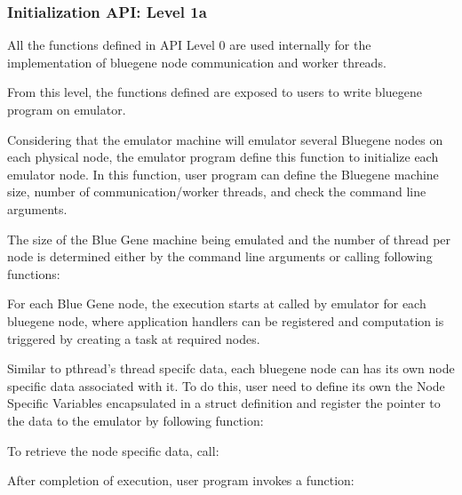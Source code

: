\subsubsection{Initialization API: Level 1a}

All the functions defined in API Level 0 are used internally for the 
implementation of bluegene node communication and worker threads.

From this level, the functions defined are exposed to users to write bluegene
program on emulator.

Considering that the emulator machine will emulator several Bluegene nodes on
each physical node, the emulator program define this function 
 to initialize each emulator
node. In this function, user program can define the Bluegene machine size,
number of communication/worker threads, and check the command line arguments.

The size of the Blue Gene machine being emulated and the number of thread per
node is determined either by the command line arguments or calling following
functions:





For each Blue Gene node, the execution starts at 
 called by emulator for each 
bluegene node, where application handlers can be registered and computation 
is triggered by creating a task at required nodes.

Similar to pthread's thread specifc data, each bluegene node can has its
own node specific data associated with it. To do this, user need to define its 
own the Node Specific Variables encapsulated in a struct definition and register
 the pointer to the data to the emulator by following function:


To retrieve the node specific data, call:


After completion of execution, user program invokes a function:

